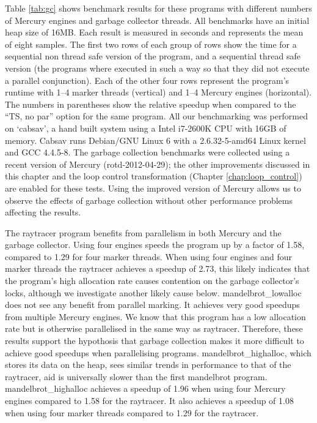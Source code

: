Table \ref{tab:gc} shows benchmark results for these programs
with different numbers of Mercury engines and garbage collector threads.
All benchmarks have an initial heap size of 16MB.
Each result is measured in seconds and represents the mean of eight samples.
The first two rows of each group of rows show the time for a sequential
non thread safe version of the program,
and a sequential thread safe version
(the programs where executed in such a way so that they did not execute a
parallel conjunction).
Each of the other four rows represent the program's runtime with
1--4 marker threads (vertical) and
1--4 Mercury engines (horizontal).
The numbers in parentheses show the relative speedup when compared to the
``TS, no par'' option for the same program.
\label{cabsav}
All our benchmarking was performed on `cabsav',
a hand built system using a Intel i7-2600K CPU 
with 16GB of memory.
Cabsav runs Debian/GNU Linux 6
with a 2.6.32-5-amd64 Linux kernel and GCC 4.4.5-8.
The garbage collection benchmarks were collected using a recent version of
Mercury (rotd-2012-04-29);
the other improvements discussed in this chapter and the loop control
transformation (Chapter \ref{chap:loop_control})
are enabled for these tests.
Using the improved version of Mercury allows us to observe the effects of
garbage collection without other performance problems affecting the results.

The raytracer program benefits from parallelism in both Mercury and the
garbage collector.
Using four engines speeds the program up by a factor of 1.58,
compared to 1.29 for four marker threads.
When using four engines and four marker threads the raytracer
achieves a speedup of 2.73,
this likely indicates that the program's high allocation rate causes
contention on the garbage collector's locks,
although we investigate another likely cause below.
mandelbrot\_lowalloc does not see any benefit from parallel marking.
It achieves very good speedups from multiple Mercury engines.
We know that this program has a low allocation rate
but is otherwise parallelised in the same way as raytracer.
Therefore,
these results support the hypothosis that garbage collection makes it more
difficult to achieve good speedups when parallelising programs.
mandelbrot\_highalloc, which stores its data on the heap,
sees similar trends in performance to that of the raytracer,
aid is universally slower than the first mandelbrot program.
mandelbrot\_highalloc achieves a speedup of 1.96 when using four Mercury
engines compared to 1.58 for the raytracer.
It also achieves a speedup of 1.08 when using four marker threads compared
to 1.29 for the raytracer.

